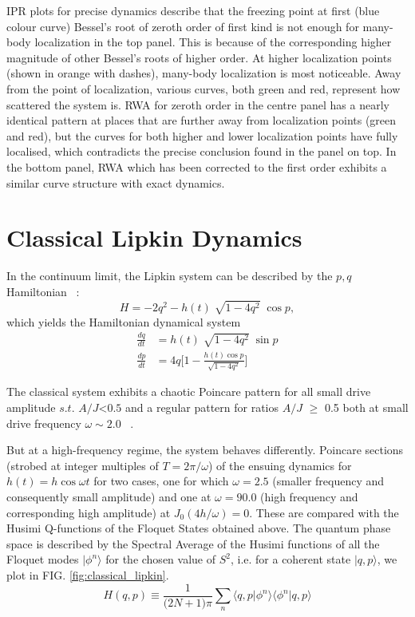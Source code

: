\documentclass[%
 reprint,
superscriptaddress,
 amsmath,amssymb,
 aps,
prb,
]{revtex4-2}
\begin{document}
IPR plots for precise dynamics describe that the freezing point at first (blue colour curve) Bessel's root of zeroth order of first kind is not enough for many-body localization in the top panel. This is because of the corresponding higher magnitude of other Bessel's roots of higher order. At higher localization points (shown in orange with dashes), many-body localization is most noticeable. Away from the point of localization, various curves, both green and red, represent how scattered the system is.	RWA for zeroth order in the centre panel has a nearly identical pattern at places that are further away from localization points (green and red), but the curves for both higher and lower localization points have fully localised, which contradicts the precise conclusion found in the panel on top. In the bottom panel, RWA which has been corrected to the first order exhibits a similar curve structure with exact dynamics.

\section{\label{sec:level4}Classical Lipkin Dynamics}
In the continuum limit, the Lipkin system can be described by the $p,q$ Hamiltonian ~\cite{sciolla_quantum_2010}:
\begin{equation}
	H = -2 q^2 - h(t)\;\sqrt{1-4q^2}\;\cos{p},
\end{equation}
which yields the Hamiltonian dynamical system 
\begin{align}
	\frac{dq}{dt} &= h(t)\;\sqrt{1-4q^2}\;\sin{p}\nonumber \\
	\frac{dp}{dt} &= 4q\bigg[1-\frac{h(t)\cos{p}}{\sqrt{1-4q^2}}\bigg]
\end{align}

The classical system exhibits a chaotic Poincare pattern  for all small drive amplitude $s.t.$  $A/J $<$ 0.5 $ and a regular pattern for ratios $A/J$ $\geq$ 0.5 both at small drive frequency $\omega \sim 2.0$ ~\cite{russomanno_thermalization_2015}. 

But at a high-frequency regime, the system behaves differently. Poincare sections (strobed at integer multiples of $T=2\pi/\omega$) of the ensuing dynamics for $h(t)=h\cos{\omega t}$ for two cases, one for which $\omega=2.5$ (smaller frequency and consequently small amplitude) and one at $\omega=90.0$ (high frequency and corresponding high amplitude) at $J_0(4h/\omega)=0$. These are compared with the Husimi Q-functions of the Floquet States obtained above. The quantum phase space is described by the Spectral Average of the Husimi functions of all the Floquet modes $|\phi^n\rangle$ for the chosen value of $S^2$, i.e. for a coherent state $|q, p\rangle$, we plot in FIG. \ref{fig:classical_lipkin}.
\begin{equation*}
	H(q,p)\equiv \frac{1}{\big(2N+1\big)\pi}\sum_n \langle q,p\vert \phi^n\rangle\langle\phi^n\vert q,p\rangle
\end{equation*}
\end{document}
